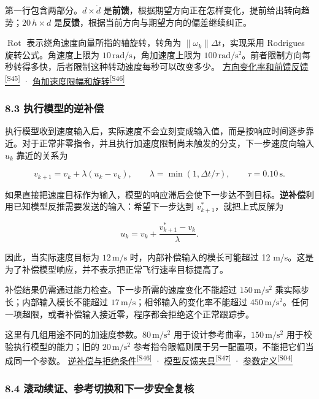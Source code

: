 \documentclass[11pt,a4paper]{article}
\numberwithin{equation}{topic}
\newcommand{\sourceref}[2]{\hyperlink{source-#1}{#2\textsuperscript{[#1]}}}
\begin{document}
第一行包含两部分。\(d\times\dot d\) 是\textbf{前馈}，根据期望方向正在怎样变化，提前给出转向趋势；\(20\,h\times d\) 是\textbf{反馈}，根据当前方向与期望方向的偏差继续纠正。

\(\operatorname{Rot}\) 表示绕角速度向量所指的轴旋转，转角为 \(\|\omega_k\|\Delta t\)，实现采用 Rodrigues 旋转公式。角速度上限为 \(10\,\mathrm{rad/s}\)，角加速度上限为 \(100\,\mathrm{rad/s^2}\)。前者限制方向每秒转得多快，后者限制这种转动速度每秒可以改变多少。 \sourceref{S45}{方向变化率和前馈反馈} · \sourceref{S46}{角加速度限幅和旋转}

\subsubsection*{8.3 执行模型的逆补偿}

执行模型收到速度输入后，实际速度不会立刻变成输入值，而是按响应时间逐步靠近。对于正常非零指令，并且执行加速度限制尚未触发的分支，下一步速度向输入 \(u_k\) 靠近的关系为

\begin{equation}
\label{eq:actuator}
v_{k+1}=v_k+\lambda(u_k-v_k),\qquad
\lambda=\min(1,\Delta t/\tau),\qquad \tau=0.10\,\mathrm s.
\end{equation}

如果直接把速度目标作为输入，模型的响应滞后会使下一步达不到目标。\textbf{逆补偿}利用已知模型反推需要发送的输入：希望下一步达到 \(v^*_{k+1}\)，就把上式反解为

\begin{equation}
\label{eq:compensation}
u_k=v_k+\frac{v^*_{k+1}-v_k}{\lambda}.
\end{equation}

因此，当实际速度目标为 \(12\,\mathrm{m/s}\) 时，内部补偿输入的模长可能超过 12 m/s。这是为了补偿模型响应，并不表示把正常飞行速率目标提高了。

补偿结果仍需通过能力检查。下一步所需的速度变化不能超过 \(150\,\mathrm{m/s^2}\) 乘实际步长；内部输入模长不能超过 \(17\,\mathrm{m/s}\)；相邻输入的变化率不能超过 \(450\,\mathrm{m/s^2}\)。任何一项超限，或者补偿输入接近零，程序都会拒绝这个正常跟踪步。

这里有几组用途不同的加速度参数。\(80\,\mathrm{m/s^2}\) 用于设计参考曲率，\(150\,\mathrm{m/s^2}\) 用于校验执行模型的能力；旧的 \(20\,\mathrm{m/s^2}\) 参考指令限幅则属于另一配置项，不能把它们当成同一个参数。 \sourceref{S46}{逆补偿与拒绝条件} · \sourceref{S47}{模型反馈夹具} · \sourceref{S04}{参数定义}

\subsubsection*{8.4 滚动续证、参考切换和下一步安全复核}
\end{document}

